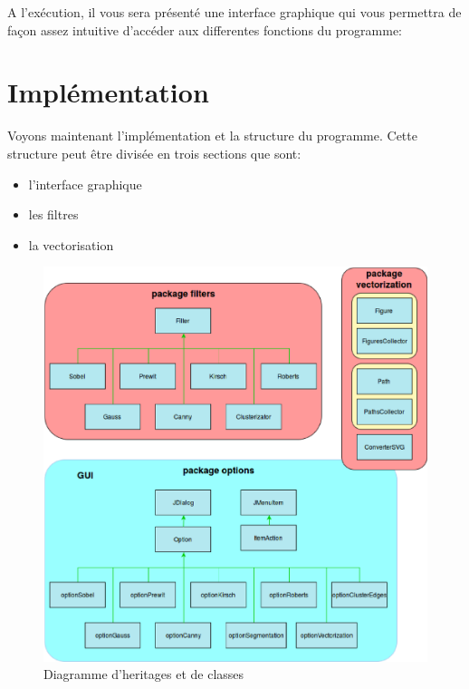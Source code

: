 \documentclass[twoside,openright,a4paper,11pt,french]{article}
\begin{document}
\vspace{1cm}
A l'exécution, il vous sera présenté une interface graphique qui vous
permettra de façon assez intuitive d'accéder aux differentes fonctions
du programme:

\begin{center}
\end{center}

\newpage 
\section{Implémentation}
Voyons maintenant l'implémentation et la structure du programme.
Cette structure peut être divisée en trois sections que sont:
\begin{itemize}
\item l'interface graphique
\item les filtres
\item la vectorisation
\end{itemize}

\begin{figure}[h]
\centering
\includegraphics[width=12cm]{./pics/classes.eps}
\caption{Diagramme d’heritages et de classes}
\end{figure}
\end{document}
